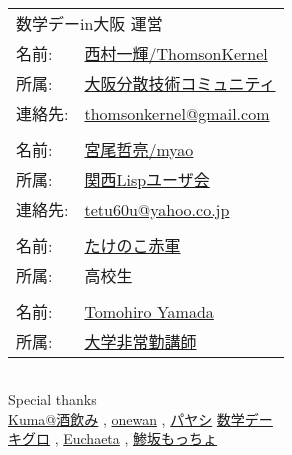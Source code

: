 \documentclass[b5paper,fleqn]{ltjsarticle}
\begin{document}
\newpage
\thispagestyle{empty}
\begin{flushright}
\begin{minipage}{0.5\hsize}
  \begin{tabular}{|ll}
  \multicolumn{2}{|l}{数学デーin大阪 運営}\\[10pt]
  名前: &\href{https://twitter.com/ThomsonKernel}{西村一輝/ThomsonKernel}\\
  所属: &\href{https://sites.google.com/view/osaka-dtc}{大阪分散技術コミュニティ}\\
  連絡先: & \href{mailto:thomsonkernel@gmail.com}{thomsonkernel@gmail.com}\\
  \\
  名前: &\href{https://twitter.com/myao_s_moking}{宮尾哲亮/myao}\\
  所属: &\href{https://kansai-lisp-useres.connpass.com}{関西Lispユーザ会}\\
  連絡先: & \href{mailto:tetu60u@yahoo.co.jp}{tetu60u@yahoo.co.jp}\\
  \\
  名前: &\href{https://twitter.com/691_7758337633}{たけのこ赤軍}\\
  所属: &高校生\\
  \\
  名前: &\href{https://twitter.com/tyamada1093}{Tomohiro Yamada}\\
  所属: &\href{https://kansai-lisp-useres.connpass.com}{大学非常勤講師}\\
  \end{tabular}
  \begin{tabular}{l}
\end{tabular}\vskip15pt
Special thanks\\
   \href{https://twitter.com/notori48}{Kuma@酒飲み}
   , \href{https://twitter.com/ONEWAN}{onewan}
   , \href{https://twitter.com/Paya_payashi}{パヤシ}\vskip10pt
   \href{https://twitter.com/sugaku_day}{数学デー}\\
   \href{https://twitter.com/kiguro_masanao}{キグロ}
   , \href{https://twitter.com/euchaeta}{Euchaeta}
   , \href{https://twitter.com/motcho_tw}{鯵坂もっちょ}
\end{minipage}
\end{flushright}
\end{document}
